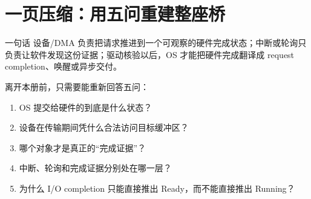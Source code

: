 \documentclass[UTF8,fontset=none,11pt,a4paper]{ctexart}
\begin{document}
\section{一页压缩：用五问重建整座桥}

\begin{corebox}{一句话}
设备/DMA 负责把请求推进到一个可观察的硬件完成状态；中断或轮询只负责让软件发现这份证据；驱动核验以后，OS 才能把硬件完成翻译成 request completion、唤醒或异步交付。
\end{corebox}

离开本册前，只需要能重新回答五问：

\begin{enumerate}
  \item OS 提交给硬件的到底是什么状态？
  \item 设备在传输期间凭什么合法访问目标缓冲区？
  \item 哪个对象才是真正的“完成证据”？
  \item 中断、轮询和完成证据分别处在哪一层？
  \item 为什么 I/O completion 只能直接推出 Ready，而不能直接推出 Running？
\end{enumerate}
\end{document}

